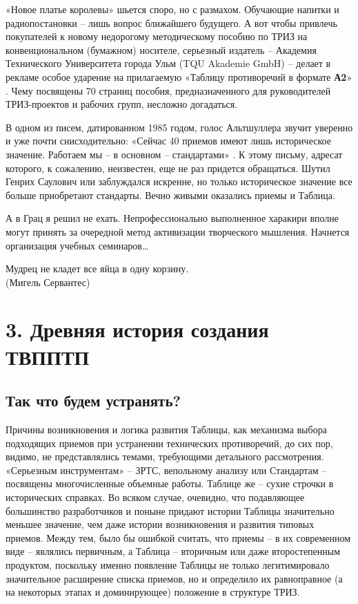 \documentclass[11pt,a4paper]{article}
\begin{document}
«Новое платье королевы» шьется споро, но с размахом. Обучающие напитки и
радиопостановки -- лишь вопрос ближайшего будущего. А вот чтобы привлечь
покупателей к новому недорогому методическому пособию по ТРИЗ на
конвенциональном (бумажном) носителе, серьезный издатель -- Академия
Технического Университета города Ульм (TQU Akademie GmbH) -- делает в рекламе
особое ударение на прилагаемую «Таблицу противоречий в формате \textbf{А2}»
\cite{Blaesing2001}. Чему посвящены 70 страниц пособия, предназначенного для
руководителей ТРИЗ-проектов и рабочих групп, несложно догадаться.

В одном из писем, датированном 1985 годом, голос Альтшуллера звучит уверенно и
уже почти снисходительно: «Сейчас 40 приемов имеют лишь историческое значение.
Работаем мы -- в основном -- стандартами» \cite{Altshuller1985}.  К этому
письму, адресат которого, к сожалению, неизвестен, еще не раз придется
обращаться. Шутил Генрих Саулович или заблуждался искренне, но только
историческое значение все больше приобретают стандарты. Вечно живыми оказались
приемы и Таблица.

А в Грац я решил не ехать. Непрофессионально выполненное харакири вполне могут
принять за очередной метод активизации творческого мышления. Начнется
организация учебных семинаров…

\clearpage
\begin{flushright}
  Мудрец не кладет все яйца в одну корзину.\\
  (Мигель Сервантес)
\end{flushright}
\section*{3. Древняя история создания ТВППТП}

\subsection*{Так что будем устранять?}

Причины возникновения и логика развития Таблицы, как механизма выбора
подходящих приемов при устранении технических противоречий, до сих пор,
видимо, не представлялись темами, требующими детального рассмотрения.
«Серьезным инструментам» -- ЗРТС, вепольному анализу или Стандартам --
посвящены многочисленные объемные работы. Таблице же -- сухие строчки в
исторических справках. Во всяком случае, очевидно, что подавляющее большинство
разработчиков и поныне придают истории Таблицы значительно меньшее значение,
чем даже истории возникновения и развития типовых приемов. Между тем, было бы
ошибкой считать, что приемы -- в их современном виде -- являлись первичным, а
Таблица -- вторичным или даже второстепенным продуктом, поскольку именно
появление Таблицы не только легитимировало значительное расширение списка
приемов, но и определило их равноправное (а на некоторых этапах и
доминирующее) положение в структуре ТРИЗ.
\end{document}
